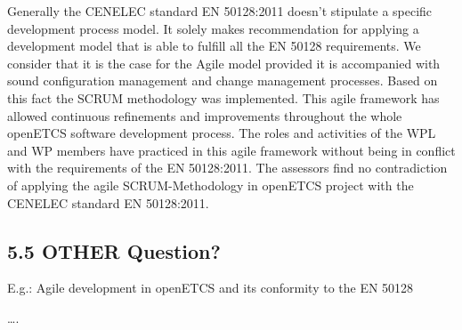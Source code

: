 \bigskip
Generally the CENELEC standard EN 50128:2011 doesn’t stipulate a specific development process model. It solely makes recommendation for applying a development model that is able to fulfill all the EN 50128 requirements. We consider that it is the case for the Agile model provided it is accompanied with sound configuration management and change management processes.
\newline
\newline
Based on this fact the SCRUM methodology was implemented. This agile framework has allowed continuous refinements and improvements throughout the whole openETCS software development process. The roles and activities of the WPL and WP members have practiced in this agile framework without being in conflict with the requirements of the EN 50128:2011.
\newline
\newline
The assessors find no contradiction of applying the agile SCRUM-Methodology in openETCS project with the CENELEC standard EN 50128:2011.
\bigskip


\subsection{5.5 OTHER Question?}
{\textbullet} E.g.: Agile development in openETCS and its conformity to the EN 50128 

{\textbullet} {\dots}.